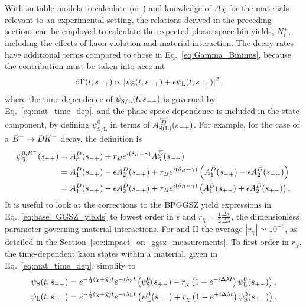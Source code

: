 With suitable models to calculate \ADorDbSL (or \ADorDbonetwo) and knowledge of $\Delta\chi$ for the materials relevant to an experimental setting, the relations derived in the preceding sections can be employed to calculate the expected phase-space bin yields, $N^\pm_i$, including the effects of kaon \CP violation and material interaction. The decay rates have additional terms compared to those in Eq.~\eqref{eq:Gamma_Bminus}, because the \KL contribution must be taken into account
\begin{align}\label{eq:Gamma_with_KL_and_phsp}
    \text{d} \Gamma(t, s_{-+}) &\propto \left|\psi_\text{S}(t, s_{-+}) + \epsilon \psi_\text{L}(t, s_{-+})\right|^2,
\end{align}
where the time-dependence of $\psi_{\text{S/L}}(t, s_{-+})$ is governed by Eq.~\eqref{eq:mat_time_dep}, and the phase-space dependence is included in the state component, by defining $\psi_{\text{S/L}}^0$ in terms of $\ADorDbSL(\smp)$. For example, for the case of a ${{{B}^-}}\rightarrow{\ensuremath{D}}{\ensuremath{{K}^-}}$ decay, the definition is
\begin{align}
\begin{split}\label{eq:state_def}
  \psi_\text{S}^{0, {{{B}^-}}}(s_{-+}) &= A_{\rm S}^{D}(s_{-+}) + r_B e^{i(\delta_B-\gamma)}A_{\rm S}^{{\kern 0.18em\overline{\kern -0.18em D}}}(s_{-+}) \\
  &= A^{D}_1(s_{-+}) - \epsilon A^{D}_2(s_{-+}) + r_B e^{i(\delta_B-\gamma)}\left(A^{{\kern 0.18em\overline{\kern -0.18em D}}}_1(s_{-+}) - \epsilon A^{{\kern 0.18em\overline{\kern -0.18em D}}}_2(s_{-+})\right) \\
  &= A^{D}_1(s_{-+}) - \epsilon A^{D}_2(s_{-+}) + r_B e^{i(\delta_B-\gamma)}\left(A^{D}_1(s_{+-}) + \epsilon A^{D}_2(s_{+-})\right).
\end{split}
\end{align}
It is useful to look at the corrections to the BPGGSZ yield expressions in Eq.~\eqref{eq:base_GGSZ_yields} to lowest order in $\epsilon$ and $r_\chi=\frac{1}{2}\frac{\Delta \chi}{\Delta \lambda}$, the dimensionless parameter governing material interactions. For \lhcb and \belle II the average $|r_\chi|\simeq10^{-3}$, as detailed in the Section~\ref{sec:impact_on_ggsz_measurements}.  To first order in $r_\chi$, the time-dependent kaon states within a material, given in Eq.~\eqref{eq:mat_time_dep}, simplify to~\cite{fetscherRegenerationArbitraryCoherent1996}
\begin{align}
\begin{split}
        \psi_\text{S}(t, s_{+-}) &= e^{-\frac{i}{2}(\chi + \bar \chi)t}e^{-i \lambda_{\rm S}t}\left( \psi^0_{\rm S}(s_{+-})
        -r_\chi\left(1-e^{-i\Delta\lambda t} \right)\psi^0_{\rm L}(s_{+-})\right), \\
    \psi_\text{L}(t, s_{+-}) &= e^{-\frac{i}{2}(\chi + \bar \chi)t}e^{-i \lambda_{\rm L}t}\left( \psi^0_{\rm L}(s_{+-})  
        +r_\chi\left(1-e^{+i\Delta\lambda t}\right)\psi^0_{\rm S}(s_{+-})\right).
\end{split}
\end{align}
